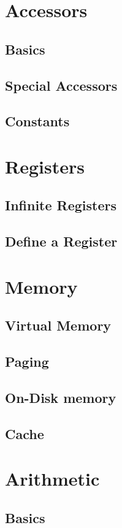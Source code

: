 \documentclass{scrartcl}
\begin{document}
    \section{Accessors}
        \subsection{Basics}
        \subsection{Special Accessors}
        \subsection{Constants}
    \section{Registers}
        \subsection{Infinite Registers}
        \subsection{Define a Register}
    \section{Memory}
        \subsection{Virtual Memory}
        \subsection{Paging}
        \subsection{On-Disk memory}
        \subsection{Cache}
    \section{Arithmetic}
        \subsection{Basics}
\end{document}

